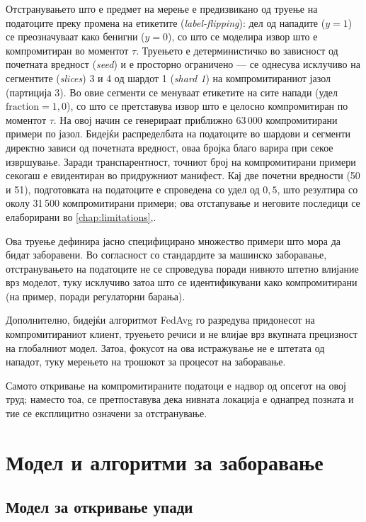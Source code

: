 Отстранувањето што е предмет на мерење е предизвикано од труење на податоците преку промена на етикетите (\emph{label-flipping}): дел од нападите ($y=1$) се преозначуваат како бенигни ($y=0$), со што се моделира извор што е компромитиран во моментот $\tau$. 
Труењето е детерминистичко во зависност од почетната вредност (\emph{seed}) и е просторно ограничено --- се однесува исклучиво на сегментите (\emph{slices}) 3 и 4 од шардот 1 (\emph{shard 1}) на компромитираниот јазол (партиција 3). Во овие сегменти се менуваат етикетите на сите напади (удел $\text{fraction}=1{,}0$), со што се претставува извор што е целосно компромитиран по моментот $\tau$. 
На овој начин се генерираат приближно 63\,000 компромитирани примери по јазол. Бидејќи распределбата на податоците во шардови и сегменти директно зависи од почетната вредност, оваа бројка благо варира при секое извршување. Заради транспарентност, точниот број на компромитирани примери секогаш е евидентиран во придружниот манифест. Кај две почетни вредности (50 и 51), подготовката на податоците е спроведена со удел од $0{,}5$, што резултира со околу 31\,500 компромитирани примери; ова отстапување и неговите последици се елаборирани во \ref{chap:limitations},.

Ова труење дефинира јасно специфицирано множество примери што мора да бидат заборавени. Во согласност со стандардите за машинско заборавање, отстранувањето на податоците не се спроведува поради нивното штетно влијание врз моделот, туку исклучиво затоа што се идентификувани како компромитирани (на пример, поради регулаторни барања). 

Дополнително, бидејќи алгоритмот FedAvg го разредува придонесот на компромитираниот клиент, труењето речиси и не влијае врз вкупната прецизност на глобалниот модел. Затоа, фокусот на ова истражување не е штетата од нападот, туку мерењето на трошокот за процесот на заборавање. 

Самото откривање на компромитираните податоци е надвор од опсегот на овој труд; наместо тоа, се претпоставува дека нивната локација е однапред позната и тие се експлицитно означени за отстранување.

\section{Модел и алгоритми за заборавање} %
\label{sec:core_algorithm}

\subsection{Модел за откривање упади}

